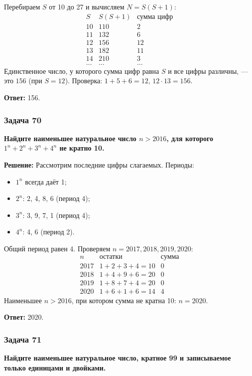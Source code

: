 \documentclass[12pt, a4paper]{article}
\begin{document}
Перебираем $S$ от 10 до 27 и вычисляем $N = S(S+1)$:
\[
\begin{array}{c|c|c}
S & S(S+1) & \text{сумма цифр} \\
\hline
10 & 110 & 2 \\
11 & 132 & 6 \\
12 & 156 & 12 \\
13 & 182 & 11 \\
14 & 210 & 3 \\
\ldots & \ldots & \ldots
\end{array}
\]
Единственное число, у которого сумма цифр равна $S$ и все цифры различны, — это $156$ (при $S=12$). Проверка: $1+5+6=12$, $12 \cdot 13 = 156$.

\textbf{Ответ:} 156.

\subsubsection*{Задача 70}
\textbf{Найдите наименьшее натуральное число $n > 2016$, для которого $1^n + 2^n + 3^n + 4^n$ не кратно 10.}

\textbf{Решение:}
Рассмотрим последние цифры слагаемых. Периоды:
\begin{itemize}
    \item $1^n$ всегда даёт 1;
    \item $2^n$: 2, 4, 8, 6 (период 4);
    \item $3^n$: 3, 9, 7, 1 (период 4);
    \item $4^n$: 4, 6 (период 2).
\end{itemize}
Общий период равен 4. Проверяем $n = 2017, 2018, 2019, 2020$:
\[
\begin{array}{c|c|c}
n & \text{остатки} & \text{сумма} \\
\hline
2017 & 1+2+3+4 = 10 & 0 \\
2018 & 1+4+9+6 = 20 & 0 \\
2019 & 1+8+7+4 = 20 & 0 \\
2020 & 1+6+1+6 = 14 & 4
\end{array}
\]
Наименьшее $n > 2016$, при котором сумма не кратна 10: $n = 2020$.

\textbf{Ответ:} 2020.

\subsubsection*{Задача 71}
\textbf{Найдите наименьшее натуральное число, кратное 99 и записываемое только единицами и двойками.}
\end{document}
